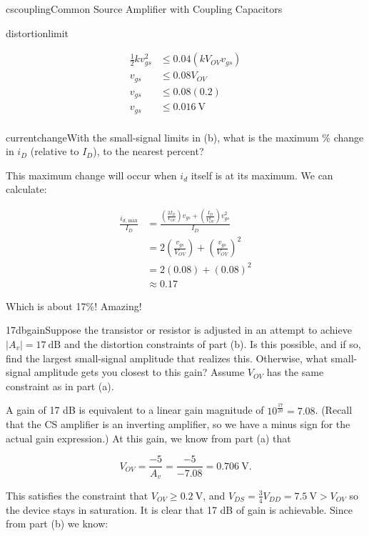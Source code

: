 \begin{mainquestion}{cscoupling}{Common Source Amplifier with Coupling Capacitors}
\begin{partquestion}{distortionlimit}
\begin{answer}
\begin{align*}
    \frac{1}{2}k v_{gs}^2 &\leq 0.04 (k V_{OV} v_{gs}) \\
    v_{gs} &\leq 0.08 V_{OV} \\
    v_{gs} &\leq 0.08 (0.2) \\
    v_{gs} &\leq \qty{0.016}{\volt} \\
\end{align*}
\end{answer}
\end{partquestion}

\begin{partquestion}{currentchange}{With the small-signal limits in (b), what is the maximum \% change in $i_{D}$ (relative to $I_{D}$), to the nearest percent?}
\begin{answer}
This maximum change will occur when $i_{d}$ itself is at its maximum. We can calculate:

\begin{align*}
    \frac{i_{d\text{, max}}}{I_D} &= \frac{\left(\frac{2 I_D}{V_{OV}}\right)v_{gs} + \left(\frac{I_D}{V_{OV}^2}\right)v_{gs}^2}{I_D}\\
    &= 2\left(\frac{v_{gs}}{V_{OV}}\right) + \left(\frac{v_{gs}}{V_{OV}}\right)^2\\
    &= 2(0.08) + (0.08)^2\\
    &\approx 0.17
\end{align*}

Which is about 17\%! Amazing!
\end{answer}
\end{partquestion}

\begin{partquestion}{17dbgain}{Suppose the transistor or resistor is adjusted in an attempt to achieve $\left|A_{v}\right| = 17\ \text{dB}$ and the distortion constraints of part (b). Is this possible, and if so, find the largest small-signal amplitude that realizes this. Otherwise, what small-signal amplitude gets you closest to this gain? Assume $V_{OV}$ has the same constraint as in part (a).}
\begin{answer}
A gain of 17 dB is equivalent to a linear gain magnitude of $10^{\frac{17}{20}} = 7.08$. (Recall that the CS amplifier is an inverting amplifier, so we have a minus sign for the actual gain expression.) At this gain, we know from part (a) that

\[
V_{OV} = \frac{-5}{A_{v}} = \frac{-5}{-7.08} = 0.706\ \text{V}.
\]

This satisfies the constraint that $V_{OV} \geq 0.2\ \text{V}$, and $V_{DS} = \frac{3}{4}V_{DD} = 7.5\ \text{V} > V_{OV}$ so the device stays in saturation. It is clear that 17 dB of gain is achievable. Since from part (b) we know:


\end{answer}
\end{partquestion}
\end{mainquestion}
